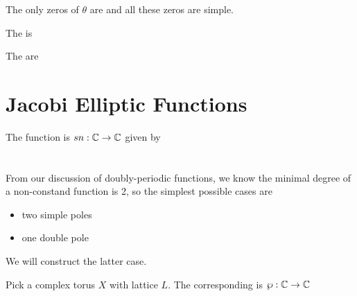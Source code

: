 \documentclass{article}
\begin{document}
\begin{prop}
	The only zeros of $\theta$ are 
and all these zeros are simple. 
\end{prop}

\begin{definition}
	The  is 
\end{definition}

\begin{definition}
	The  are 
\end{definition}
\section{Jacobi Elliptic Functions}

\begin{definition}
	The  function is $sn:\mathbb{C} \to \mathbb{C}$ given by 
\end{definition}

\section{}

From our discussion of doubly-periodic functions, we know the minimal degree of a non-constand function is 2, so the simplest possible cases are 
\begin{itemize}
	\item two simple poles
	\item one double pole
\end{itemize}
We will construct the latter case.

\begin{definition}
	Pick a complex torus $X$ with lattice $L$. The corresponding  is $\wp:\mathbb{C} \to \mathbb{C}$ 
\end{definition}
\end{document}
